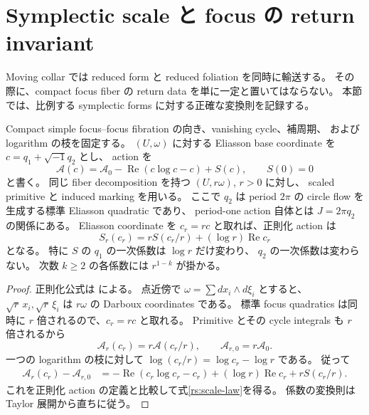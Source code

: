 \section{Symplectic scale と focus の return invariant}
\label{rs:section}

Moving collar では reduced form と reduced foliation を同時に輸送する。
その際に、compact focus fiber の return data を単に一定と置いてはならない。
本節では、比例する symplectic forms に対する正確な変換則を記録する。

\begin{proposition}
\label{rs:scaling}
Compact simple focus--focus fibration の向き、vanishing cycle、補周期、
および logarithm の枝を固定する。
$(U,\omega)$ に対する Eliasson base coordinate を $c=q_1+\sqrt{-1}q_2$ とし、
action を
\[
 \mathcal A(c)=\mathcal A_0-\operatorname{Re}(c\log c-c)+S(c),
 \qquad S(0)=0
\]
と書く。
同じ fiber decomposition を持つ $(U,r\omega)$, $r>0$ に対し、
scaled primitive と induced marking を用いる。
ここで $q_2$ は period $2\pi$ の circle flow を生成する標準 Eliasson quadratic であり、
period-one action 自体とは $J=2\pi q_2$ の関係にある。
Eliasson coordinate を $c_r=rc$ と取れば、正則化 action は
\begin{equation}\label{rs:scale-law}
 S_r(c_r)=rS(c_r/r)+(\log r)\operatorname{Re}c_r
\end{equation}
となる。
特に $S$ の $q_1$ の一次係数は $\log r$ だけ変わり、
$q_2$ の一次係数は変わらない。
次数 $k\ge2$ の各係数には $r^{1-k}$ が掛かる。
\end{proposition}

\begin{proof}
正則化公式は \cite[Proposition 3.1, Remark 3.2]{vungoc-local} による。
点近傍で $\omega=\sum dx_i\wedge d\xi_i$ とすると、
$\sqrt r\,x_i,\sqrt r\,\xi_i$ は $r\omega$ の Darboux coordinates である。
標準 focus quadratics は同時に $r$ 倍されるので、$c_r=rc$ と取れる。
Primitive とその cycle integrals も $r$ 倍されるから
\[
 \mathcal A_r(c_r)=r\mathcal A(c_r/r),\qquad
 \mathcal A_{r,0}=r\mathcal A_0.
\]
一つの logarithm の枝に対して $\log(c_r/r)=\log c_r-\log r$ である。
従って
\begin{align*}
 \mathcal A_r(c_r)-\mathcal A_{r,0}
 &=-\operatorname{Re}(c_r\log c_r-c_r)
   +(\log r)\operatorname{Re}c_r+rS(c_r/r).
\end{align*}
これを正則化 action の定義と比較して式\eqref{rs:scale-law}を得る。
係数の変換則は Taylor 展開から直ちに従う。
\end{proof}

